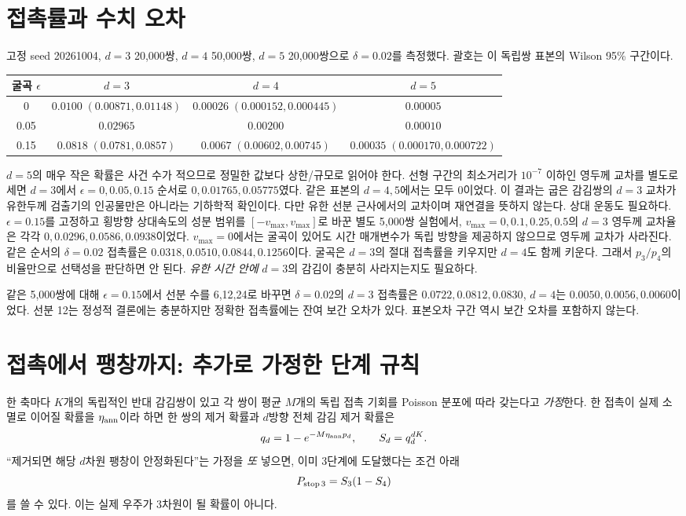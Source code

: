\documentclass[11pt,a4paper]{article}
\begin{document}
\section{접촉률과 수치 오차}
고정 seed 20261004, $d=3$ 20,000쌍, $d=4$ 50,000쌍,
$d=5$ 20,000쌍으로 $\delta=0.02$를 측정했다.
괄호는 이 독립쌍 표본의 Wilson 95\% 구간이다.
\begin{center}
\begin{tabular}{@{}cccc@{}}
\toprule
굴곡 $\epsilon$ & $d=3$ & $d=4$ & $d=5$\\
\midrule
0 & $0.0100\;(0.00871,0.01148)$ &
$0.00026\;(0.000152,0.000445)$ & $0.00005$\\
0.05 & $0.02965$ & $0.00200$ & $0.00010$\\
0.15 & $0.0818\;(0.0781,0.0857)$ &
$0.0067\;(0.00602,0.00745)$ &
$0.00035\;(0.000170,0.000722)$\\
\bottomrule
\end{tabular}
\end{center}
$d=5$의 매우 작은 확률은 사건 수가 적으므로
정밀한 값보다 상한/규모로 읽어야 한다.
선형 구간의 최소거리가 $10^{-7}$ 이하인 영두께 교차를
별도로 세면 $d=3$에서 $\epsilon=0,0.05,0.15$ 순서로
$0,0.01765,0.05775$였다. 같은 표본의 $d=4,5$에서는
모두 0이었다. 이 결과는 굽은 감김쌍의 $d=3$ 교차가
유한두께 검출기의 인공물만은 아니라는 기하학적 확인이다.
다만 유한 선분 근사에서의 교차이며 재연결을 뜻하지 않는다.
상대 운동도 필요하다. $\epsilon=0.15$를 고정하고 횡방향
상대속도의 성분 범위를 $[-v_{\max},v_{\max}]$로 바꾼
별도 5,000쌍 실험에서, $v_{\max}=0,0.1,0.25,0.5$의
$d=3$ 영두께 교차율은 각각
$0,0.0296,0.0586,0.0938$이었다.
$v_{\max}=0$에서는 굴곡이 있어도 시간 매개변수가
독립 방향을 제공하지 않으므로 영두께 교차가 사라진다.
같은 순서의 $\delta=0.02$ 접촉률은
$0.0318,0.0510,0.0844,0.1256$이다.
굴곡은 $d=3$의 절대 접촉률을 키우지만 $d=4$도 함께 키운다.
그래서 $p_3/p_4$의 비율만으로 선택성을 판단하면 안 된다.
\emph{유한 시간 안에} $d=3$의 감김이 충분히 사라지는지도 필요하다.

같은 5,000쌍에 대해 $\epsilon=0.15$에서 선분 수를 6,12,24로
바꾸면 $\delta=0.02$의 $d=3$ 접촉률은
$0.0722,0.0812,0.0830$, $d=4$는
$0.0050,0.0056,0.0060$이었다. 선분 12는 정성적 결론에는
충분하지만 정확한 접촉률에는 잔여 보간 오차가 있다.
표본오차 구간 역시 보간 오차를 포함하지 않는다.

\section{접촉에서 팽창까지: 추가로 가정한 단계 규칙}
한 축마다 $K$개의 독립적인 반대 감김쌍이 있고 각 쌍이 평균
$M$개의 독립 접촉 기회를 Poisson 분포에 따라 갖는다고
\emph{가정}한다. 한 접촉이 실제 소멸로 이어질 확률을
$\eta_{\rm ann}$이라 하면 한 쌍의 제거 확률과 $d$방향
전체 감김 제거 확률은
\begin{equation}
q_d=1-e^{-M\eta_{\rm ann}p_d},\qquad
S_d=q_d^{dK}.
\end{equation}
``제거되면 해당 $d$차원 팽창이 안정화된다''는 가정을
\emph{또} 넣으면, 이미 3단계에 도달했다는 조건 아래
\begin{equation}
P_{\rm stop\,3}=S_3(1-S_4)
\end{equation}
를 쓸 수 있다. 이는 실제 우주가 3차원이 될 확률이 아니다.
\end{document}
